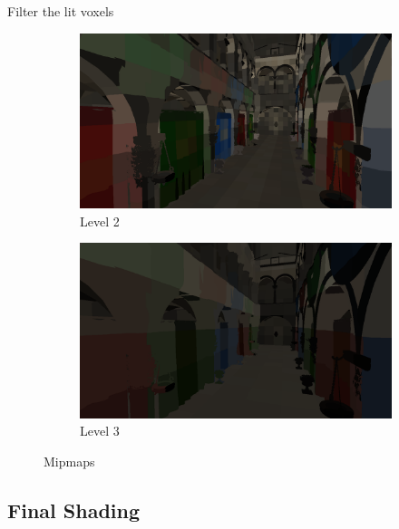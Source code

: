 \documentclass[10pt]{beamer}
\begin{document}
\begin{frame}{Filter the lit voxels}
\begin{figure}
    \begin{subfigure}[b]{0.475\textwidth}
        \centering
        \includegraphics[width=\textwidth]{mipmap2.png}
        \caption*{Level 2}
    \end{subfigure}
    \quad
    \begin{subfigure}[b]{0.475\textwidth}
        \centering
        \includegraphics[width=\textwidth]{mipmap3.png}
        \caption*{Level 3}
    \end{subfigure}
    \caption*{Mipmaps}
  \end{figure}
\end{frame}

\subsection{Final Shading}

\end{document}
